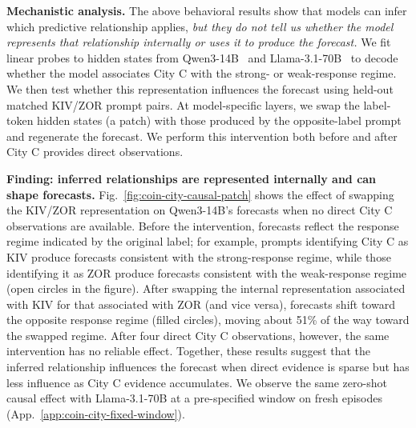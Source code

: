 \documentclass{article}
\begin{document}
\noindent\textbf{Mechanistic analysis.}
The above behavioral results show that models can infer which predictive relationship applies, \textit{but they do not tell us whether the model represents that relationship internally or uses it to produce the forecast.}
We fit linear probes to hidden states from Qwen3-14B~\citep{yang2025qwen3} and Llama-3.1-70B~\citep{grattafiori2024llama3} to decode whether the model associates City C with the strong- or weak-response regime.
We then test whether this representation influences the forecast using held-out matched KIV/ZOR prompt pairs. At model-specific layers, we swap the label-token hidden states (a patch) with those produced by the opposite-label prompt and regenerate the forecast. We perform this intervention both before and after City C provides direct observations.


\noindent\textbf{Finding: inferred relationships are represented internally and can shape forecasts.}
Fig.~\ref{fig:coin-city-causal-patch} shows the effect of swapping the KIV/ZOR representation on Qwen3-14B's forecasts when no direct City C observations are available.
Before the intervention, forecasts reflect the response regime indicated by the original label; for example, prompts identifying City C as KIV produce forecasts consistent with the strong-response regime, while those identifying it as ZOR produce forecasts consistent with the weak-response regime (open circles in the figure).
After swapping the internal representation associated with KIV for that associated with ZOR (and vice versa), forecasts shift toward the opposite response regime (filled circles), moving about 51\% of the way toward the swapped regime.
After four direct City C observations, however, the same intervention has no reliable effect.
Together, these results suggest that the inferred relationship influences the forecast when direct evidence is sparse but has less influence as City C evidence accumulates.
We observe the same zero-shot causal effect with Llama-3.1-70B at a pre-specified window on fresh episodes (App.~\ref{app:coin-city-fixed-window}).
\end{document}
